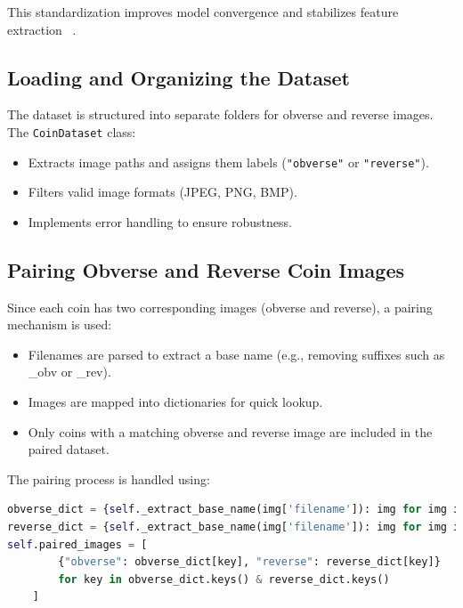 \documentclass[nolibertine, english, algorithm, nomencl, minted]{ttlab-qualify}
\begin{document}
This standardization improves model convergence and stabilizes feature extraction ~\parencite{krizhevsky2012imagenet}.

\subsection{Loading and Organizing the Dataset}
The dataset is structured into separate folders for obverse and reverse images. The \texttt{CoinDataset} class:
\begin{itemize}
    \item Extracts image paths and assigns them labels (\texttt{"obverse"} or \texttt{"reverse"}).
    \item Filters valid image formats (JPEG, PNG, BMP).
    \item Implements error handling to ensure robustness.
\end{itemize}

\subsection{Pairing Obverse and Reverse Coin Images}
Since each coin has two corresponding images (obverse and reverse), a pairing mechanism is used:
\begin{itemize}
    \item Filenames are parsed to extract a base name (e.g., removing suffixes such as \_obv or \_rev).
    \item Images are mapped into dictionaries for quick lookup.
    \item Only coins with a matching obverse and reverse image are included in the paired dataset.
\end{itemize}

The pairing process is handled using:

\begin{footnotesize}
\begin{center}
\begin{tcolorbox}[colback=gray!10, colframe=black, arc=5mm]
\begin{lstlisting}[language=Python, breaklines=true]
obverse_dict = {self._extract_base_name(img['filename']): img for img in self.obverse_images}
reverse_dict = {self._extract_base_name(img['filename']): img for img in self.reverse_images}
self.paired_images = [
        {"obverse": obverse_dict[key], "reverse": reverse_dict[key]}
        for key in obverse_dict.keys() & reverse_dict.keys()
    ]
\end{lstlisting}
\end{tcolorbox}
\end{center}
\end{footnotesize}
\end{document}
